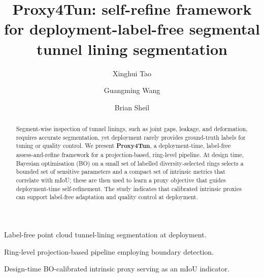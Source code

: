 \documentclass[a4paper,fleqn]{cas-dc}
\begin{document}
\let\WriteBookmarks\relax
\def\floatpagepagefraction{1}
\def\textpagefraction{.001}


{

\title[mode=title]{Proxy4Tun: self-refine framework for deployment-label-free segmental tunnel lining segmentation}

\author[1]{Xinghui Tao}

\author[1]{Guangming Wang}
\cormark[1]

\author[1]{Brian Sheil}





\begin{abstract}
Segment-wise inspection of tunnel linings, such as joint gaps, leakage, and deformation, requires accurate segmentation, yet deployment rarely provides ground-truth labels for tuning or quality control. We present \textbf{Proxy4Tun}, a deployment-time, label-free assess-and-refine framework for a projection-based, ring-level pipeline. At design time, Bayesian optimisation (BO) on a small set of labelled diversity-selected rings selects a bounded set of sensitive parameters and a compact set of intrinsic metrics that correlate with mIoU; these are then used to learn a proxy objective that guides deployment-time self-refinement. The study indicates that calibrated intrinsic proxies can support label-free adaptation and quality control at deployment.
\end{abstract}



\begin{highlights}
\item Label-free point cloud tunnel-lining segmentation at deployment.
\item Ring-level projection-based pipeline employing boundary detection.
\item Design-time BO-calibrated intrinsic proxy serving as an mIoU indicator.
\end{highlights}

}
\end{document}
